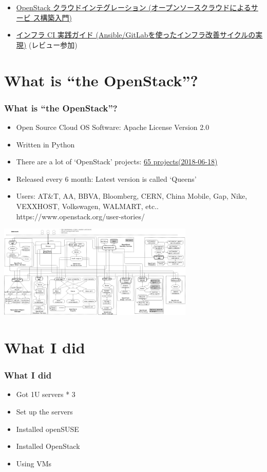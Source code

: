 \documentclass[aspectratio=169,11pt,hyperref={colorlinks=true}]{beamer}
\begin{document}
\begin{frame}
\begin{itemize}
      \begin{itemize}
      \item \href{https://www.amazon.co.jp/dp/4798139785/}{OpenStack
        クラウドインテグレーション (オープンソースクラウドによるサービ
        ス構築入門)}
      \item \href{https://www.amazon.co.jp/dp/4798155128/}{インフラ CI
        実践ガイド (Ansible/GitLabを使ったインフラ改善サイクルの実
        現)} (レビュー参加)
      \end{itemize}
  \end{itemize}
\end{frame}

\section{What is ``the OpenStack''?}
\begin{frame}
  \frametitle{What is ``the OpenStack''?}
  \begin{itemize}
    \item Open Source Cloud OS Software: Apache License Version 2.0
    \item Written in Python
    \item There are a lot of `OpenStack' projects: \href{http://governance.openstack.org/reference/projects/index.html}{65 projects(2018-06-18)}
    \item Released every 6 month: Latest version is called `Queens'
    \item Users: AT\&T, AA, BBVA, Bloomberg, CERN,
      China Mobile, Gap, Nike, VEXXHOST,
      Volkswagen, WALMART, etc.. https://www.openstack.org/user-stories/
  \end{itemize}
  \begin{center}
    \includegraphics[width=0.7\textwidth]{openstack-arch-kilo-logical-v1.png}
  \end{center}
\end{frame}

\section{What I did}
\begin{frame}
  \frametitle{What I did}
  \begin{itemize}
    \item Got 1U servers * 3
    \item Set up the servers
    \item Installed openSUSE
    \item Installed OpenStack
    \item Using VMs
  \end{itemize}
\end{frame}
\end{document}

